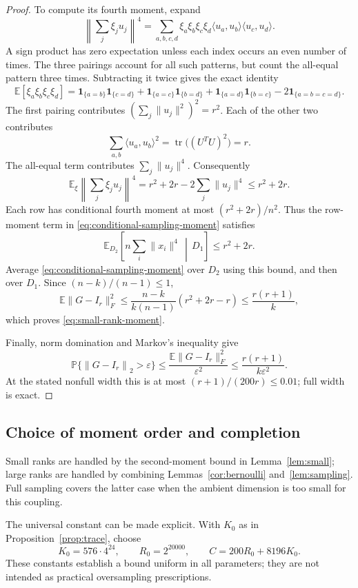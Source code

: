 \documentclass[11pt]{article}
\theoremstyle{definition}
\theoremstyle{remark}
\theoremstyle{plain}
\newcommand{\E}{\mathbb E}
\newcommand{\Prob}{\mathbb P}
\newcommand{\one}{\mathbf 1}
\DeclareMathOperator{\tr}{tr}
\newcommand{\norm}[1]{\left\lVert#1\right\rVert_2}
\begin{document}
\begin{proof}
To compute its fourth moment, expand
\[
 \left\|\sum_j\xi_j u_j\right\|^4
   =\sum_{a,b,c,d}\xi_a\xi_b\xi_c\xi_d
                    \langle u_a,u_b\rangle\langle u_c,u_d\rangle.
\]
A sign product has zero expectation unless each index occurs an
even number of times. The three pairings account for all such
patterns, but count the all-equal pattern three times. Subtracting
it twice gives the exact identity
\[
 \E[\xi_a\xi_b\xi_c\xi_d]
   =\one_{\{a=b\}}\one_{\{c=d\}}
     +\one_{\{a=c\}}\one_{\{b=d\}}
     +\one_{\{a=d\}}\one_{\{b=c\}}
     -2\one_{\{a=b=c=d\}}.
\]
The first pairing contributes $(\sum_j\|u_j\|^2)^2=r^2$.
Each of the other two contributes
\[
 \sum_{a,b}\langle u_a,u_b\rangle^2
    =\tr\bigl((U^TU)^2\bigr)=r.
\]
The all-equal term contributes $\sum_j\|u_j\|^4$. Consequently
\[
 \E_{\xi}\left\|\sum_j\xi_j u_j\right\|^4
             =r^2+2r-2\sum_j\|u_j\|^4\le r^2+2r.
\]
Each row has conditional fourth moment at most $(r^2+2r)/n^2$.
Thus the row-moment
term in \eqref{eq:conditional-sampling-moment} satisfies
\[
 \E_{D_2}\!\left[n\sum_i\|x_i\|^4\,\middle|\,D_1\right]
       \le r^2+2r.
\]
Average \eqref{eq:conditional-sampling-moment} over $D_2$ using
this bound, and then over $D_1$. Since $(n-k)/(n-1)\le1$,
\[
 \E\|G-I_r\|_F^2
    \le\frac{n-k}{k(n-1)}(r^2+2r-r)
    \le\frac{r(r+1)}k,
\]
which proves \eqref{eq:small-rank-moment}.

Finally, norm domination and Markov's inequality give
\[
 \Prob\{\norm{G-I_r}>\varepsilon\}
    \le\frac{\E\|G-I_r\|_F^2}{\varepsilon^2}
    \le\frac{r(r+1)}{k\varepsilon^2}.
\]
At the stated nonfull width this is at most
\((r+1)/(200r)\le0.01\); full width is exact.
\end{proof}
\subsection{Choice of moment order and completion}

Small ranks are handled by the second-moment bound in
Lemma~\ref{lem:small}; large ranks are handled by combining
Lemmas~\ref{cor:bernoulli} and~\ref{lem:sampling}.
Full sampling covers the latter case when the ambient dimension
is too small for this coupling.

The universal constant can be made explicit. With $K_0$ as in
Proposition~\ref{prop:trace}, choose
\begin{equation}\label{eq:universal-constants}
 K_0=576\cdot4^{24},\qquad R_0=2^{20000},\qquad
 C=200R_0+8196K_0.
\end{equation}
These constants establish a bound uniform in all parameters; they
are not intended as practical oversampling prescriptions.
\end{document}
